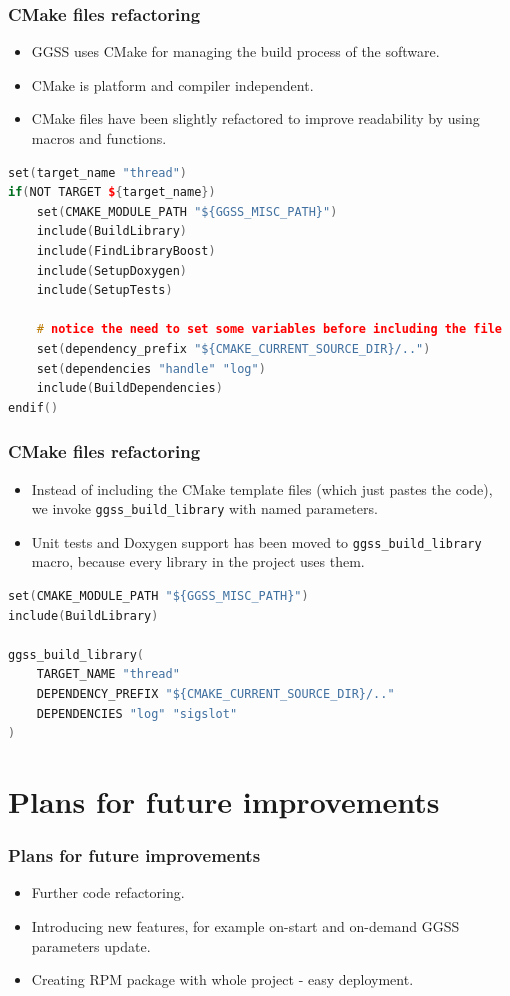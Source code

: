 \documentclass[10pt]{beamer}
\begin{document}
\begin{frame}[fragile]
\frametitle{CMake files refactoring}
\begin{itemize}
\item GGSS uses CMake for managing the build process of the software.
\item CMake is platform and compiler independent.
\item CMake files have been slightly refactored to improve readability by using macros and functions.
\end{itemize}
\begin{lstlisting}[language=c++, caption={Old version of CMake used for building \emph{thread-lib}}]
set(target_name "thread")
if(NOT TARGET ${target_name})
    set(CMAKE_MODULE_PATH "${GGSS_MISC_PATH}")
    include(BuildLibrary)
    include(FindLibraryBoost)
    include(SetupDoxygen)
    include(SetupTests)

    # notice the need to set some variables before including the file
    set(dependency_prefix "${CMAKE_CURRENT_SOURCE_DIR}/..")
    set(dependencies "handle" "log")
    include(BuildDependencies)
endif() 
\end{lstlisting}
\end{frame}


\begin{frame}[fragile]
\frametitle{CMake files refactoring}
\begin{itemize}
\item Instead of including the CMake template files (which just pastes the code), we invoke \lstinline[basicstyle=\ttfamily\normalsize]{ggss_build_library} with named parameters.
\item Unit tests and Doxygen support has been moved to \lstinline[basicstyle=\ttfamily\normalsize]{ggss_build_library} macro, because every library in the project uses them.
\end{itemize}
\begin{lstlisting}[language=c++, caption={New version of CMake used for building \emph{thread-lib}}]
set(CMAKE_MODULE_PATH "${GGSS_MISC_PATH}")
include(BuildLibrary)

ggss_build_library(
    TARGET_NAME "thread"
    DEPENDENCY_PREFIX "${CMAKE_CURRENT_SOURCE_DIR}/.."
    DEPENDENCIES "log" "sigslot"
)
\end{lstlisting}
\end{frame}



\section{Plans for future improvements}


\begin{frame}[fragile]
\frametitle{Plans for future improvements}
\begin{itemize}
\item Further code refactoring.
\item Introducing new features, for example on-start and on-demand GGSS parameters update.
\item Creating RPM package with whole project - easy deployment.
\end{itemize}
\end{frame}
\end{document}
